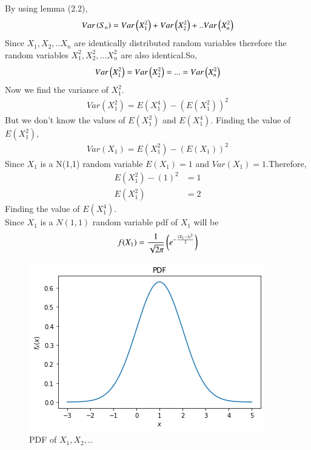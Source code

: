 \documentclass[journal,12pt,twocolumn]{IEEEtran}
\begin{document}
By using lemma (2.2),
\begin{align}
    Var\left(S_{n}\right)=Var\left(X_{1}^2\right)+Var\left(X_{2}^2\right)+..Var\left(X_{n}^2\right)
\end{align}
Since $X_{1},X_{2},..X_{n}$ are identically distributed random variables therefore the random variables $X_{1}^2,X_{2}^2,...X_{n}^2$ are also identical.So,
\begin{align}
    Var\left(X_{1}^2\right)=Var\left(X_{2}^2\right)=...=Var\left(X_{n}^2\right)
\end{align}
Now we find the variance of $X_{1}^2$.
\begin{align}
    Var(X_{1}^2)=E(X_{1}^4)-(E(X_{1}^2))^2
\end{align}
But we don't know the values of $E(X_{1}^2)$ and $E(X_{1}^4)$.
Finding the value of $E(X_{1}^2)$,
\begin{align}
    Var(X_{1})=E(X_{1}^2)-(E(X_{1}))^2
\end{align}
Since $X_{1}$ is a N(1,1) random variable $E(X_{1})=1$ and $Var(X_{1})=1$.Therefore,
\begin{align}
    E(X_{1}^2)-(1)^2&=1
 \\  E(X_{1}^2)&=2
\end{align}
Finding the value of $E(X_{1}^4)$.
\\Since $X_{1}$ is a $N(1,1)$ random variable pdf of $X_{1}$ will be 
\begin{align}
    f(X_{1})=\frac{1}{\sqrt{2\pi}}\left(e^{-\frac{(X_{1}-1)^2}{2}}\right)
\end{align}
\begin{figure}[h]
    \centering
    \includegraphics[width=\columnwidth]{PDF.png}
    \caption{PDF of $X_{1},X_{2},..$}
    \label{fig:my_label}
\end{figure}
\end{document}
